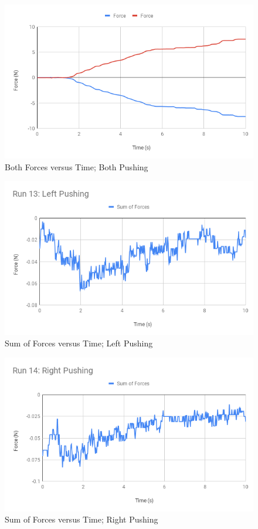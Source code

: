 \begin{figure}[ht]
    \centering
    \includegraphics[scale=0.71]{image/05-third-law/Run-15-Both.png}
    \caption{Both Forces versus Time; Both Pushing}
    \label{figure:05.ff.B}
\end{figure}
\begin{figure}[ht]
    \centering
    \includegraphics[scale=0.71]{image/05-third-law/Run-13-Left-Pushing.png}
    \caption{Sum of Forces versus Time; Left Pushing}
    \label{figure:05.sf.L}
\end{figure}
\begin{figure}[ht]
    \centering
    \includegraphics[scale=0.71]{image/05-third-law/Run-14-Right-Pushing.png}
    \caption{Sum of Forces versus Time; Right Pushing}
    \label{figure:05.sf.R}
\end{figure}
